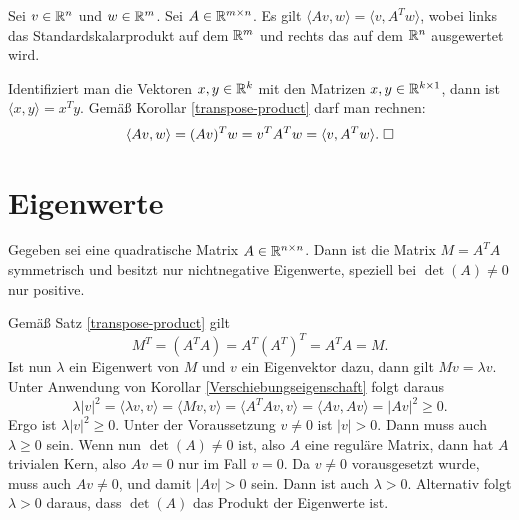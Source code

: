 \begin{Korollar}\label{Verschiebungseigenschaft}
Sei $v\in\mathbb R^n$ und $w\in\mathbb R^m$. Sei $A\in\mathbb R^{m\times n}$. Es gilt
$\langle Av,w\rangle = \langle v,A^Tw\rangle$,
wobei links das Standardskalarprodukt auf dem $\mathbb R^m$ und
rechts das auf dem $\mathbb R^n$ ausgewertet wird.
\end{Korollar}
\begin{Beweis}
Identifiziert man die Vektoren $x,y\in\mathbb R^k$ mit den
Matrizen $x,y\in\mathbb R^{k\times 1}$, dann
ist $\langle x,y\rangle = x^T y$. Gemäß Korollar
\ref{transpose-product} darf man rechnen:
\[\langle Av,w\rangle
= (Av)^T w = v^T A^T w = \langle v,A^Tw\rangle.\;\square\]
\end{Beweis}

\newpage
\section{Eigenwerte}

\begin{Satz}
Gegeben sei eine quadratische Matrix $A\in\mathbb R^{n\times n}$.
Dann ist die Matrix $M=A^T A$ symmetrisch und besitzt nur
nichtnegative Eigenwerte, speziell bei $\det(A)\ne 0$ nur positive.
\end{Satz}

\begin{Beweis}
Gemäß Satz \ref{transpose-product} gilt
\begin{equation}
M^T = (A^T A) = A^T (A^T)^T = A^T A = M.
\end{equation}
Ist nun $\lambda$ ein Eigenwert von $M$ und $v$ ein Eigenvektor dazu,
dann gilt $Mv=\lambda v$. Unter Anwendung von Korollar
\ref{Verschiebungseigenschaft} folgt daraus
\begin{equation}
\lambda |v|^2 = \langle\lambda v,v\rangle
= \langle Mv,v\rangle = \langle A^T Av,v\rangle
= \langle Av,Av\rangle = |Av|^2\ge 0.
\end{equation}
Ergo ist $\lambda|v|^2\ge 0$. Unter der Voraussetzung $v\ne 0$ ist
$|v|>0$. Dann muss auch $\lambda\ge 0$ sein. Wenn nun $\det(A)\ne 0$
ist, also $A$ eine reguläre Matrix, dann hat $A$ trivialen Kern,
also $Av=0$ nur im Fall $v=0$. Da $v\ne 0$ vorausgesetzt wurde,
muss auch $Av\ne 0$, und damit $|Av|>0$ sein. Dann ist auch
$\lambda>0$. Alternativ folgt $\lambda>0$ daraus, dass $\det(A)$
das Produkt der Eigenwerte ist.\;\qedsymbol
\end{Beweis}
